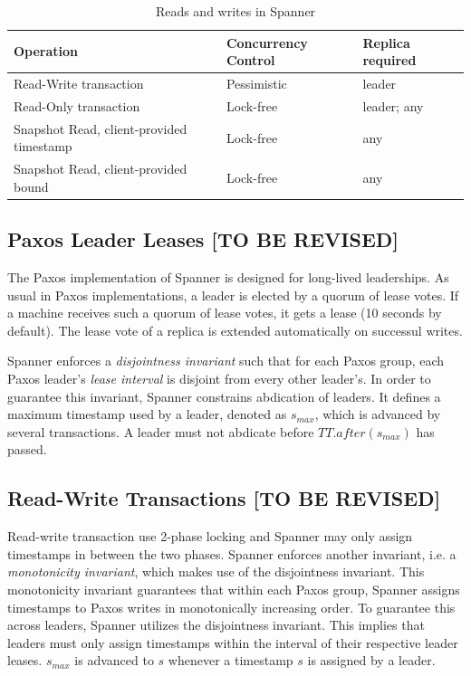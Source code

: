 \documentclass[onecolumn, a4paper, 10pt]{article}
\newcommand{\tbr}{{\color{red}\textbf{[TO BE REVISED]}}}
\begin{document}
\begin{table}
  \centering
  \begin{tabular}{|l||l|l|}
    \hline
    {\bfseries Operation} & {\bfseries Concurrency Control} &
    {\bfseries Replica required} \tabularnewline
    \hline\hline
    Read-Write transaction & Pessimistic & leader \tabularnewline
    \hline
    Read-Only transaction & Lock-free & leader; any
    \tabularnewline
    \hline
    Snapshot Read, client-provided timestamp & Lock-free & any \tabularnewline
    \hline
    Snapshot Read, client-provided bound & Lock-free & any \tabularnewline
    \hline
  \end{tabular}
  \caption{Reads and writes in Spanner}
  \label{tbl:reads-writes}
\end{table}

\subsection{Paxos Leader Leases \tbr}
\label{subsec:paxos-leader-leases}

The Paxos implementation of Spanner is designed for long-lived leaderships. As
usual in Paxos implementations, a leader is elected by a quorum of lease votes.
If a machine receives such a quorum of lease votes, it gets a lease (10 seconds
by default). The lease vote of a replica is extended automatically on successul
writes.

Spanner enforces a \emph{disjointness invariant} such that for each Paxos group,
each Paxos leader's \emph{lease interval} is disjoint from every other leader's.
In order to guarantee this invariant, Spanner constrains abdication of leaders.
It defines a maximum timestamp used by a leader, denoted as $s_{max}$, which is
advanced by several transactions. A leader must not abdicate before
$TT.after\left(s_{max}\right)$ has passed.

\subsection{Read-Write Transactions \tbr}
\label{subsec:read-write-transactions}

Read-write transaction use 2-phase locking and Spanner may only assign timestamps
in between the two phases. Spanner enforces another invariant, i.e. a
\emph{monotonicity invariant}, which makes use of the disjointness invariant.
This monotonicity invariant guarantees that within each Paxos group, Spanner
assigns timestamps to Paxos writes in monotonically increasing order. To guarantee
this across leaders, Spanner utilizes the disjointness invariant. This implies
that leaders must only assign timestamps within the interval of their respective
leader leases. $s_{max}$ is advanced to $s$ whenever a timestamp $s$ is assigned
by a leader.
\end{document}
